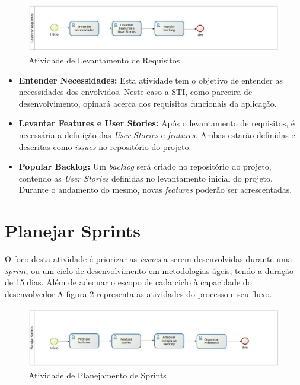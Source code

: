 \begin{figure}[ht]
	\centering
	\includegraphics[keepaspectratio=true,scale=0.9, width=\textwidth]{figuras/fig07.eps}
	\caption{Atividade de Levantamento de Requisitos}
	\label{fig07}
\end{figure}

\begin{itemize}

	\item \textbf{Entender Necessidades:} Esta atividade tem o objetivo de entender as necessidades dos envolvidos. Neste caso a STI, como parceira de desenvolvimento, opinará acerca dos requisitos funcionais da aplicação.

	\item \textbf{Levantar Features e User Stories:} Após o levantamento de requisitos, é necessária a definição das \textit{User Stories} e \textit{features}. Ambas estarão definidas e descritas como \textit{issues} no repositório do projeto.

	\item \textbf{Popular Backlog:} Um \textit{backlog} será criado no repositório do projeto, contendo as \textit{User Stories} definidas no levantamento inicial do projeto. Durante o andamento do mesmo, novas \textit{features} poderão ser acrescentadas.

\end{itemize}

\section{Planejar Sprints}

O foco desta atividade é priorizar as \textit{issues} a serem desenvolvidas durante uma \textit{sprint}, ou um ciclo de desenvolvimento em metodologias ágeis,  tendo a duração de 15 dias. Além de adequar o escopo de cada ciclo à capacidade do desenvolvedor.A figura \ref{fig08} representa as atividades do processo e seu fluxo.

\begin{figure}[ht]
	\centering
	\includegraphics[keepaspectratio=true,scale=0.9, width=\textwidth]{figuras/fig08.eps}
	\caption{Atividade de Planejamento de Sprints}
	\label{fig08}
\end{figure}

